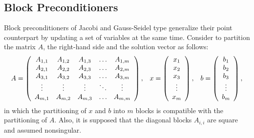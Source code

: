 \subsection{Block Preconditioners}
\label{sec:block}

Block preconditioners of Jacobi and Gauss-Seidel type generalize their point
counterpart by updating a set of variables at the same time. Consider
to partition the matrix $A$, the right-hand side and the solution vector
as follows:
\begin{equation}
\label{eq:partition}
A = 
\left(
\begin{array}{c c c c c}
A_{1,1} & A_{1,2} & A_{1,3} & \ldots & A_{1,m} \\
A_{2,1} & A_{2,2} & A_{2,3} & \ldots & A_{2,m} \\
A_{3,1} & A_{3,2} & A_{3,3} & \ldots & A_{3,m} \\
\vdots  & \vdots  & \vdots  & \ddots & \vdots  \\
A_{m,1} & A_{m,2} & A_{m,3} & \ldots & A_{m,m} \\
\end{array}
\right),
  \;\;\;
x = 
\left(
\begin{array}{c c c c c}
x_{1} \\
x_{2} \\
x_{3} \\
\vdots  \\
x_{m}
\end{array}
\right), \;\;\;
b = 
\left(
\begin{array}{c c c c c}
b_{1} \\
b_{2} \\
b_{3} \\
\vdots  \\
b_{m}
\end{array}
\right),
\end{equation}
in which the partitioning of $x$ and $b$ into $m$ blocks is compatible with the partitioning
of $A$. Also, it is supposed that the diagonal blocks $A_{i,i}$ are square
and assumed nonsingular.

